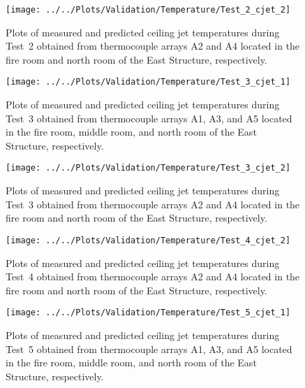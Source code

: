 \begin{figure}[!h]
	\centering
	\texttt{[image: ../../Plots/Validation/Temperature/Test\_2\_cjet\_2]}
	\caption[Plots of measured and predicted ceiling jet temperatures during Test~2.]{Plots of measured and predicted ceiling jet temperatures during Test~2 obtained from thermocouple arrays A2 and A4 located in the fire room and north room of the East Structure, respectively.}
	\label{fig:cjet2_data_Test2}
\end{figure}

\begin{figure}[!h]
	\centering
	\texttt{[image: ../../Plots/Validation/Temperature/Test\_3\_cjet\_1]}
	\caption[Plots of measured and predicted ceiling jet temperatures during Test~3.]{Plots of measured and predicted ceiling jet temperatures during Test~3 obtained from thermocouple arrays A1, A3, and A5 located in the fire room, middle room, and north room of the East Structure, respectively.}
	\label{fig:cjet1_data_Test3}
\end{figure}

\begin{figure}[!h]
	\centering
	\texttt{[image: ../../Plots/Validation/Temperature/Test\_3\_cjet\_2]}
	\caption[Plots of measured and predicted ceiling jet temperatures during Test~3.]{Plots of measured and predicted ceiling jet temperatures during Test~3 obtained from thermocouple arrays A2 and A4 located in the fire room and north room of the East Structure, respectively.}
	\label{fig:cjet2_data_Test3}
\end{figure}

\begin{figure}[!h]
	\centering
	\texttt{[image: ../../Plots/Validation/Temperature/Test\_4\_cjet\_2]}
	\caption[Plots of measured and predicted ceiling jet temperatures during Test~4.]{Plots of measured and predicted ceiling jet temperatures during Test~4 obtained from thermocouple arrays A2 and A4 located in the fire room and north room of the East Structure, respectively.}
	\label{fig:cjet2_data_Test4}
\end{figure}

\begin{figure}[!h]
	\centering
	\texttt{[image: ../../Plots/Validation/Temperature/Test\_5\_cjet\_1]}
	\caption[Plots of measured and predicted ceiling jet temperatures during Test~5.]{Plots of measured and predicted ceiling jet temperatures during Test~5 obtained from thermocouple arrays A1, A3, and A5 located in the fire room, middle room, and north room of the East Structure, respectively.}
	\label{fig:cjet1_data_Test5}
\end{figure}

